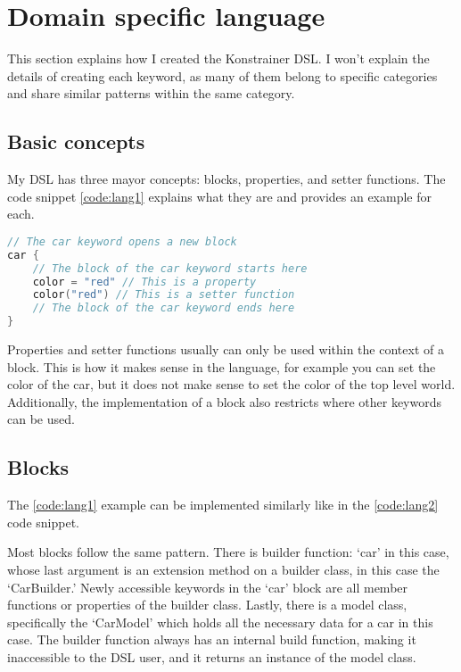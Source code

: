 \section{Domain specific language}
\label{sec:dsl}

This section explains how I created the Konstrainer DSL. I won't explain the details of creating each keyword, as many of them belong to specific categories and share similar patterns within the same category.

\subsection{Basic concepts}

My DSL has three mayor concepts: blocks, properties, and setter functions. The code snippet \ref{code:lang1} explains what they are and provides an example for each.

\begin{lstlisting}[caption={Language concepts},language=Kotlin,label=code:lang1]
// The car keyword opens a new block
car { 
    // The block of the car keyword starts here
    color = "red" // This is a property
    color("red") // This is a setter function
    // The block of the car keyword ends here
}
\end{lstlisting}

Properties and setter functions usually can only be used within the context of a block. This is how it makes sense in the language, for example you can set the color of the car, but it does not make sense to set the color of the top level world. Additionally, the implementation of a block also restricts where other keywords can be used.

\subsection{Blocks}
 
The \ref{code:lang1} example can be implemented similarly like in the \ref{code:lang2} code snippet.

Most blocks follow the same pattern. There is builder function: `car' in this case, whose last argument is an extension method on a builder class, in this case the `CarBuilder.' Newly accessible keywords in the `car' block are all member functions or properties of the builder class. Lastly, there is a model class, specifically the `CarModel' which holds all the necessary data for a car in this case. The builder function always has an internal build function, making it inaccessible to the DSL user, and it returns an instance of the model class.

